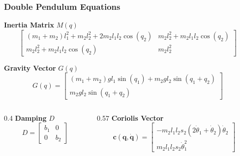 \begin{frame}
    \frametitle{Double Pendulum Equations}
    \footnotesize %

    
    \vspace{1em}
    
    \textbf{Inertia Matrix} $M(q)$
    \begin{equation}
        \begin{bmatrix}
            (m_1{+}m_2)l_1^2 + m_2l_2^2 + 2m_2l_1l_2 \cos(q_2) & m_2l_2^2 + m_2l_1l_2 \cos(q_2) \\
            m_2l_2^2 + m_2l_1l_2 \cos(q_2) & m_2l_2^2
        \end{bmatrix}
    \end{equation}

    \vspace{1em}
    
    \textbf{Gravity Vector} $G(q)$
    \begin{equation}
        G(q) = \begin{bmatrix}
            (m_1{+}m_2)g l_1 \sin(q_1) + m_2 g l_2 \sin(q_1{+}q_2) \\
            m_2 g l_2 \sin(q_1{+}q_2)
        \end{bmatrix}
    \end{equation}
    
    \vspace{1em}
    \begin{columns}[T]
        \begin{column}{0.4\textwidth}
            \textbf{Damping} $D$
            \begin{equation}
                D =
                \begin{bmatrix}
                    b_1 & 0 \\
                    0 & b_2
                \end{bmatrix}
            \end{equation}
        \end{column}
        
        \begin{column}{0.57\textwidth}
            \textbf{Coriolis Vector} 
            \begin{equation}
                \mathbf{c}(\mathbf{q}, \dot{\mathbf{q}}) = 
                \begin{bmatrix}
                    -m_2 l_1 l_2 s_2 (2\dot{\theta}_1 + \dot{\theta}_2)\dot{\theta}_2 \\
                    m_2 l_1 l_2 s_2 \dot{\theta}_1^2
                \end{bmatrix}
            \end{equation}
        \end{column}
    \end{columns}


\end{frame}
